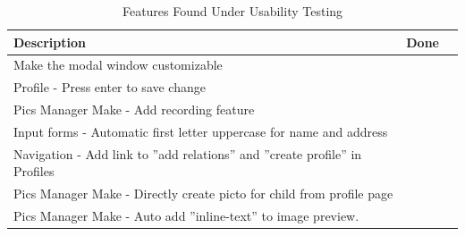 \begin{table}[htbp]
	\centering
		\begin{tabular}{|l|l|l|}
			\hline
			Description & Done\\\hline\hline
			Make the modal window customizable &\\\hline
			Profile - Press enter to save change &\\\hline
			Pics Manager Make - Add recording feature&\\\hline
			Input forms - Automatic first letter uppercase for name and address&\\\hline  
			Navigation - Add link to ''add relations'' and ''create profile'' in Profiles & \\\hline  
			Pics Manager Make - Directly create picto for child from profile page & \\\hline
			Pics Manager Make - Auto add ''inline-text'' to image preview. & \\\hline
			
		\end{tabular}
	\caption{Features Found Under Usability Testing}
	\label{tab:NewFeature}
\end{table}	
	



